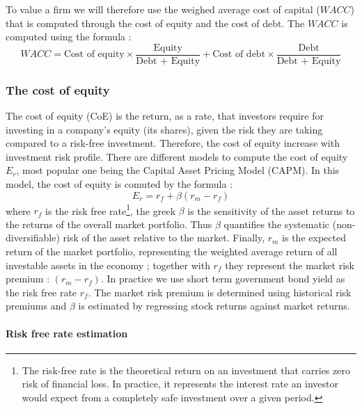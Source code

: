 To value a firm we will therefore use the weighed average cost of capital ($WACC$) that is computed through the cost of equity and the cost of debt. The $WACC$ is computed using the formula : 
\begin{equation}
    WACC = \text{Cost of equity}  \times \frac{\text{Equity}}{\text{Debt + Equity}} + \text{Cost of debt} \times \frac{\text{Debt}}{\text{Debt + Equity}}
\end{equation}


\subsubsection{The cost of equity}

The cost of equity (CoE) is the return, as a rate, that investors require for investing in a company's equity (its shares), given the risk they are taking compared to a risk-free investment. Therefore, the cost of equity increase with investment risk profile. There are different models to compute the cost of equity $E_r$, most popular one being the Capital Asset Pricing Model (CAPM). In this model, the cost of equity is comuted by the formula : 
\begin{equation}
    E_r = r_f +\beta(r_m - r_f)
\end{equation}
where $r_f$ is the risk free rate\footnote{The risk-free rate is the theoretical return on an investment that carries zero risk of financial loss.
In practice, it represents the interest rate an investor would expect from a completely safe investment over a given period.}, the greek $\beta$ is the sensitivity of the asset returns to the returns of the overall market portfolio. Thus $\beta$ quantifies the systematic (non-diversifiable) risk of the asset relative to the market. Finally, $r_m$ is the  expected return of the market portfolio, representing the weighted average return of all investable assets in the economy ; together with $r_f$ they represent the market risk premium : $(r_m - r_f)$. In practice we use short term government bond yield as the risk free rate $r_f$. The market risk premium is determined using historical risk premiums and $\beta$ is estimated by regressing stock returns against market returns. 

\paragraph{Risk free rate estimation}

